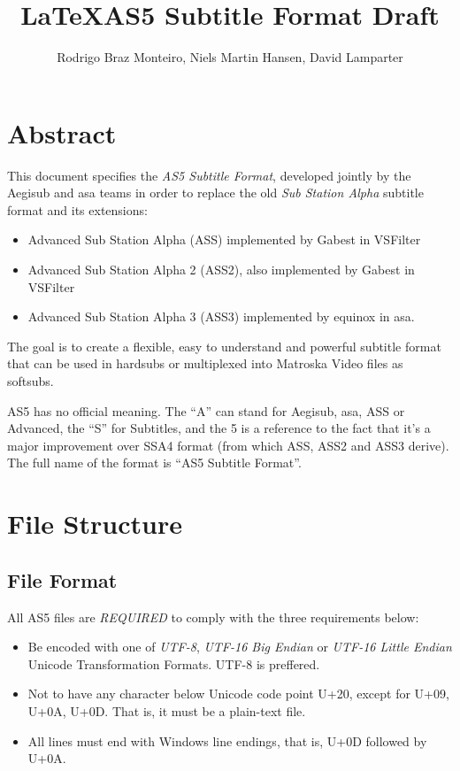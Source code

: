 \documentclass{spec}
\title{\LaTeX}
\date{}
\begin{document}
\title{AS5 Subtitle Format Draft}
\author{Rodrigo Braz Monteiro, Niels Martin Hansen, David Lamparter}
\spectitle


\section{Abstract}
This document specifies the \emph{AS5 Subtitle Format}, developed jointly by the
Aegisub\cite{Aegisub} and asa\cite{asa} teams in order to replace the old
\emph{Sub Station Alpha}\cite{SSA} subtitle format and its extensions:

\begin{itemize}
\item Advanced Sub Station Alpha (ASS) implemented by Gabest in VSFilter\cite{VSFilter}
\item Advanced Sub Station Alpha 2 (ASS2), also implemented by Gabest in VSFilter
\item Advanced Sub Station Alpha 3 (ASS3) implemented by equinox in asa.
\end{itemize}

The goal is to create a flexible, easy to understand and powerful subtitle format
that can be used in hardsubs or multiplexed into Matroska Video\cite{mkv} files as
softsubs.

AS5 has no official meaning. The "`A"' can stand for Aegisub, asa, ASS or Advanced,
the "`S"' for Subtitles, and the 5 is a reference to the fact that it's a major
improvement over SSA4 format (from which ASS, ASS2 and ASS3 derive). The full
name of the format is "`AS5 Subtitle Format"'.


\section{File Structure}
\subsection{File Format}
All AS5 files are \emph{REQUIRED} to comply with the three requirements below:

\begin{itemize}
\item Be encoded with one of \emph{UTF-8}\cite{UTF-8}, \emph{UTF-16 Big Endian}
\cite{UTF-16} or \emph{UTF-16 Little Endian} Unicode Transformation Formats. UTF-8 is
preffered.
\item Not to have any character below Unicode code point U+20, except for U+09, U+0A, U+0D.
That is, it must be a plain-text file.
\item All lines must end with Windows line endings, that is, U+0D followed by U+0A.
\end{itemize}
\end{document}
